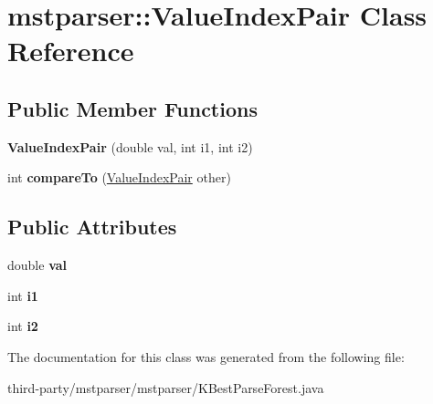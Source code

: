 \hypertarget{classmstparser_1_1ValueIndexPair}{
\section{mstparser::ValueIndexPair Class Reference}
\label{classmstparser_1_1ValueIndexPair}
}
\subsection*{Public Member Functions}
\begin{DoxyCompactItemize}
\item 
\hypertarget{classmstparser_1_1ValueIndexPair_a032c49960992d6242f6a0b69ee52c194}{
{\bfseries ValueIndexPair} (double val, int i1, int i2)}
\label{classmstparser_1_1ValueIndexPair_a032c49960992d6242f6a0b69ee52c194}

\item 
\hypertarget{classmstparser_1_1ValueIndexPair_a692707fa8ad62cc67df9257caff83895}{
int {\bfseries compareTo} (\hyperlink{classmstparser_1_1ValueIndexPair}{ValueIndexPair} other)}
\label{classmstparser_1_1ValueIndexPair_a692707fa8ad62cc67df9257caff83895}

\end{DoxyCompactItemize}
\subsection*{Public Attributes}
\begin{DoxyCompactItemize}
\item 
\hypertarget{classmstparser_1_1ValueIndexPair_afbb571ed17d1cba095cb61fd0d6991a5}{
double {\bfseries val}}
\label{classmstparser_1_1ValueIndexPair_afbb571ed17d1cba095cb61fd0d6991a5}

\item 
\hypertarget{classmstparser_1_1ValueIndexPair_abdc96336815ff6a6f5074c47a2ac7536}{
int {\bfseries i1}}
\label{classmstparser_1_1ValueIndexPair_abdc96336815ff6a6f5074c47a2ac7536}

\item 
\hypertarget{classmstparser_1_1ValueIndexPair_a8edfed12e13dda3d80db60edff4967a8}{
int {\bfseries i2}}
\label{classmstparser_1_1ValueIndexPair_a8edfed12e13dda3d80db60edff4967a8}

\end{DoxyCompactItemize}


The documentation for this class was generated from the following file:\begin{DoxyCompactItemize}
\item 
third-\/party/mstparser/mstparser/KBestParseForest.java\end{DoxyCompactItemize}
